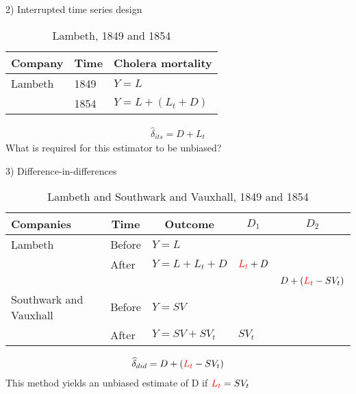 \documentclass{beamer}
\begin{document}
\begin{frame}{2) Interrupted time series design}

	\begin{table}\centering
		\caption{Lambeth, 1849 and 1854}
		\begin{center}
		\begin{tabular}{lll}
		\toprule
		\multicolumn{1}{l}{\textbf{Company}}&
		\multicolumn{1}{c}{\textbf{Time}}&
		\multicolumn{1}{c}{\textbf{Cholera mortality}}\\
		\midrule
		Lambeth & 1849 & $Y=L$ \\
		& 1854 & $Y=L + (L_t + D)$ \\
		\bottomrule
		\end{tabular}
		\end{center}
	\end{table}

\begin{eqnarray*}
\widehat{\delta}_{its} = D + L_t
\end{eqnarray*}What is required for this estimator to be unbiased?


\end{frame}

\begin{frame}{3) Difference-in-differences}

\begin{table}\centering
\scriptsize
		\caption{Lambeth and Southwark and Vauxhall, 1849 and 1854}
		\begin{center}
		\begin{tabular}{lll|lc}
		\toprule
		\multicolumn{1}{l}{\textbf{Companies}}&
		\multicolumn{1}{c}{\textbf{Time}}&
		\multicolumn{1}{c}{\textbf{Outcome}}&
		\multicolumn{1}{c}{$D_1$}&
		\multicolumn{1}{c}{$D_2$}\\
		\midrule
		Lambeth & Before & $Y=L$ \\
		& After & $Y=L + L_t + D$ & $\textcolor{red}{L_t}+D$\\
		\midrule
		& & & & $D + (\textcolor{red}{L_t}- SV_t)$ \\
		\midrule
		Southwark and Vauxhall & Before & $Y=SV$ \\
		& After & $Y=SV + SV_t$ & $SV_t$\\
		\bottomrule
		\end{tabular}
		\end{center}
	\end{table}

\begin{eqnarray*}
\widehat{\delta}_{did} = D + (\textcolor{red}{L_t}- SV_t)
\end{eqnarray*}This method yields an unbiased estimate of D if $\textcolor{red}{L_t} = SV_t$

\end{frame}
\end{document}
